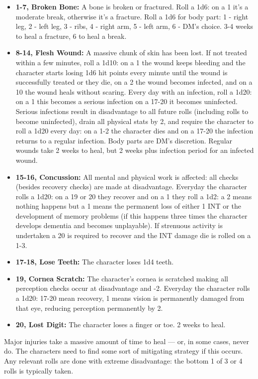 \documentclass[letterpaper,12pt]{article}
\begin{document}
\begin{itemize}
\item \textbf{1-7, Broken Bone:} A bone is broken or fractured. Roll a 1d6: on a 1 it's a moderate break, otherwise it's a fracture. Roll a 1d6 for body part: 1 - right leg, 2 - left leg, 3 - ribs, 4 - right arm, 5 - left arm, 6 - DM's choice. 3-4 weeks to heal a fracture, 6 to heal a break.
\item \textbf{8-14, Flesh Wound:} A massive chunk of skin has been lost. If not treated within a few minutes, roll a 1d10: on a 1 the wound keeps bleeding and the character starts losing 1d6 hit points every minute until the wound is successfully treated or they die, on a 2 the wound becomes infected, and on a 10 the wound heals without scaring. Every day with an infection, roll a 1d20: on a 1 this becomes a serious infection on a 17-20 it becomes uninfected. Serious infections result in disadvantage to all future rolls (including rolls to become uninfected), drain all physical stats by 2, and require the character to roll a 1d20 every day: on a 1-2 the character dies and on a 17-20 the infection returns to a regular infection. Body parts are DM's discretion. Regular wounds take 2 weeks to heal, but 2 weeks plus infection period for an infected wound. 
\item \textbf{15-16, Concussion:} All mental and physical work is affected: all checks (besides recovery checks) are made at disadvantage. Everyday the character rolls a 1d20: on a 19 or 20 they recover and on a 1 they roll a 1d2: a 2 means nothing happens but a 1 means the permanent loss of either 1 INT or the development of memory problems (if this happens three times the character develops dementia and becomes unplayable). If strenuous activity is undertaken a 20 is required to recover and the INT damage die is rolled on a 1-3. 
\item \textbf{17-18, Lose Teeth:} The character loses 1d4 teeth.
\item \textbf{19, Cornea Scratch:} The character's cornea is scratched making all perception checks occur at disadvantage and -2. Everyday the character rolls a 1d20: 17-20 mean recovery, 1 means vision is permanently damaged from that eye, reducing perception permanently by 2.
\item \textbf{20, Lost Digit:} The character loses a finger or toe. 2 weeks to heal. 
\end{itemize} 

Major injuries take a massive amount of time to heal --- or, in some cases, never do. The characters need to find some sort of mitigating strategy if this occurs. Any relevant rolls are done with extreme disadvantage: the bottom 1 of 3 or 4 rolls is typically taken.
\end{document}
